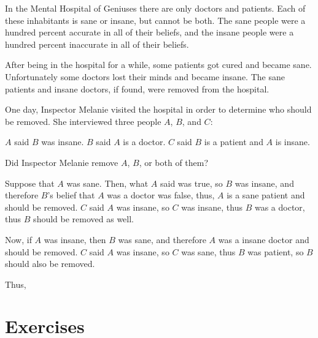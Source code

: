 \documentclass{article}
\begin{document}
\begin{example*}
    \label{example:pi-2022-4-p11}
    In the Mental Hospital of Geniuses there are only doctors and patients.
    Each of these inhabitants is sane or insane, but cannot be both.
    The sane people were a hundred percent accurate in all of their beliefs, 
    and the insane people were a hundred percent inaccurate in all of their beliefs.
    
    After being in the hospital for a while, some patients got cured and became sane.
    Unfortunately some doctors lost their minds and became insane.
    The sane patients and insane doctors, if found, were removed from the hospital.
    
    One day, Inspector Melanie visited the hospital in order to determine who should be removed.
    She interviewed three people $A$, $B$, and $C$:
    \begin{itemize}[topsep=0pt, partopsep=0pt, itemsep=0pt]
        \ii $A$ said $B$ was insane.
        \ii $B$ said $A$ is a doctor.
        \ii $C$ said $B$ is a patient and $A$ is insane.
    \end{itemize}

    Did Inspector Melanie remove $A$, $B$, or both of them?
\end{example*}

\begin{soln} 
    Suppose that $A$ was sane. Then, what $A$ said was true, so $B$ was insane, and therefore $B$'s belief that $A$ was a doctor
    was false, thus, $A$ is a sane patient and should be removed.
    $C$ said $A$ was insane, so $C$ was insane, thus $B$ was a doctor, thus $B$ should be removed as well.
    
    Now, if $A$ was insane, then $B$ was sane, and therefore $A$ was a insane doctor and should be removed.
    $C$ said $A$ was insane, so $C$ was sane, thus $B$ was patient, so $B$ should also be removed.
    
    Thus, 
\end{soln}

\section*{Exercises}
\end{document}
